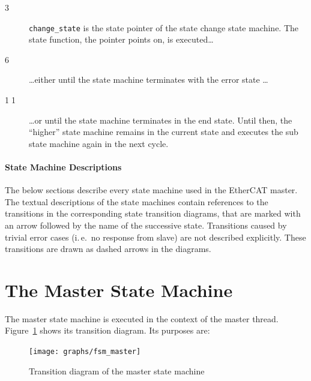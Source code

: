 \documentclass[a4paper,12pt,BCOR6mm,bibtotoc,idxtotoc]{scrbook}
\newcommand{\linenum}[1]{\normalfont\textcircled{\tiny #1}}
\begin{document}
\begin{description}

\item[\linenum{3}] \lstinline+change_state+ is the state pointer of the state
change state machine. The state function, the pointer points on, is
executed\ldots

\item[\linenum{6}] \ldots either until the state machine terminates with the
error state \ldots

\item[\linenum{11}] \ldots or until the state machine terminates in the end
state. Until then, the ``higher'' state machine remains in the current state
and executes the sub state machine again in the next cycle.

\end{description}

\paragraph{State Machine Descriptions}

The below sections describe every state machine used in the EtherCAT master.
The textual descriptions of the state machines contain references to the
transitions in the corresponding state transition diagrams, that are marked
with an arrow followed by the name of the successive state. Transitions caused
by trivial error cases (i.\,e.\ no response from slave) are not described
explicitly. These transitions are drawn as dashed arrows in the diagrams.


\section{The Master State Machine}
\label{sec:fsm-master}

The master state machine is executed in the context of the master thread.
Figure~\ref{fig:fsm-master} shows its transition diagram. Its purposes are:

\begin{figure}[htbp]
  \centering
  \texttt{[image: graphs/fsm\_master]}
  \caption{Transition diagram of the master state machine}
  \label{fig:fsm-master}
\end{figure}
\end{document}
